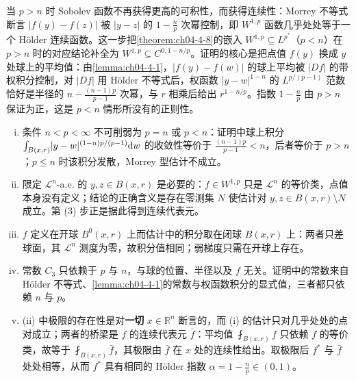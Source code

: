 \documentclass[../../main.tex]{subfiles}%
\begin{document}
\begin{remark}\label{remark:ch04-thm-4-10-动机}
当 $p>n$ 时 Sobolev 函数不再获得更高的可积性，而获得连续性：Morrey 不等式断言 $\lvert f(y)-f(z)\rvert$ 被 $\lvert y-z\rvert$ 的 $1-\frac{n}{p}$ 次幂控制，即 $W^{1,p}$ 函数几乎处处等于一个 Hölder 连续函数。这一步把\cref{theorem:ch04-4-8}的嵌入 $W^{1,p}\subseteq L^{p^*}$（$p<n$）在 $p>n$ 时的对应结论补全为 $W^{1,p}\subseteq C^{0,1-n/p}$。证明的核心是把点值 $f(y)$ 换成 $y$ 处球上的平均值：由\cref{lemma:ch04-4-1}，$\lvert f(y)-f(w)\rvert$ 的球上平均被 $\lvert Df\rvert$ 的带权积分控制，对 $\lvert Df\rvert$ 用 Hölder 不等式后，权函数 $\lvert y-w\rvert^{1-n}$ 的 $L^{p/(p-1)}$ 范数恰好是半径的 $n-\frac{(n-1)p}{p-1}$ 次幂，与 $r$ 相乘后给出 $r^{1-n/p}$。指数 $1-\frac{n}{p}$ 由 $p>n$ 保证为正，这是 $p<n$ 情形所没有的正则性。%
\end{remark}

\begin{remark}\label{remark:ch04-thm-4-10-条件}
\begin{enumerate}[(i)]
\item 条件 $n<p<\infty$ 不可削弱为 $p=n$ 或 $p<n$：证明中球上积分 $\int_{B(x,r)}\lvert y-w\rvert^{(1-n)p/(p-1)}\mathrm{d} w$ 的收敛性等价于 $\frac{(n-1)p}{p-1}<n$，后者等价于 $p>n$；$p\leqslant n$ 时该积分发散，Morrey 型估计不成立。%
\item 限定 $\mathcal{L}^{n}$-a.e. 的 $y,z\in B(x,r)$ 是必要的：$f\in W^{1,p}$ 只是 $\mathcal{L}^{n}$ 的等价类，点值本身没有定义；结论的正确含义是存在零测集 $N$ 使估计对 $y,z\in B(x,r)\setminus N$ 成立。第 (3) 步正是据此得到连续代表元。
\item $f$ 定义在开球 $B^{0}(x,r)$ 上而估计中的积分取在闭球 $B(x,r)$ 上：两者只差球面，其 $\mathcal{L}^{n}$ 测度为零，故积分值相同；弱梯度只需在开球上存在。
\item 常数 $C_3$ 只依赖于 $p$ 与 $n$，与球的位置、半径以及 $f$ 无关。证明中的常数来自 Hölder 不等式、\cref{lemma:ch04-4-1}的常数与权函数积分的显式值，三者都只依赖 $n$ 与 $p$。%
\item (ii) 中极限的存在性是对\textbf{一切} $x\in\mathbb{R}^n$ 断言的，而 (i) 的估计只对几乎处处的点对成立；两者的桥梁是 $f$ 的连续代表元 $\bar f$：平均值 $\fint_{B(x,r)}f$ 只依赖 $f$ 的等价类，故等于 $\fint_{B(x,r)}\bar f$，其极限由 $\bar f$ 在 $x$ 处的连续性给出。取极限后 $f^*$ 与 $\bar f$ 处处相等，从而 $f^*$ 具有相同的 Hölder 指数 $\alpha=1-\frac{n}{p}\in(0,1)$。
\end{enumerate}
\end{remark}
\end{document}
